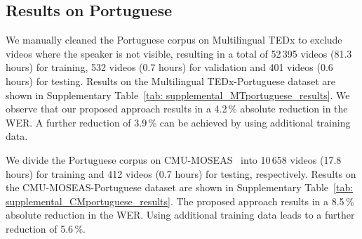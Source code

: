 \documentclass[twocolumn]{article}
\begin{document}
\subsection{Results on Portuguese}
We manually cleaned the Portuguese corpus on Multilingual TEDx to exclude videos where the speaker is not visible, resulting in a total of 52\,395 videos (81.3 hours) for training, 532 videos (0.7 hours) for validation and 401 videos (0.6 hours) for testing. Results on the Multilingual TEDx-Portuguese dataset are shown in Supplementary Table~\ref{tab: supplemental_MTportuguese_results}. We observe that our proposed approach results in a 4.2\,\% absolute reduction in the WER. A further reduction of 3.9\,\% can be achieved by using additional training data.

We divide the Portuguese corpus on CMU-MOSEAS~\cite{bagher-zadeh-etal-2020-cmu} into 10\,658 videos (17.8 hours) for training and 412 videos (0.7 hours) for testing, respectively. Results on the CMU-MOSEAS-Portuguese dataset are shown in Supplementary Table~\ref{tab: supplemental_CMportuguese_results}. The proposed approach results in a 8.5\,\% absolute reduction in the WER. Using additional training data leads to a further reduction of 5.6\,\%.
\end{document}
